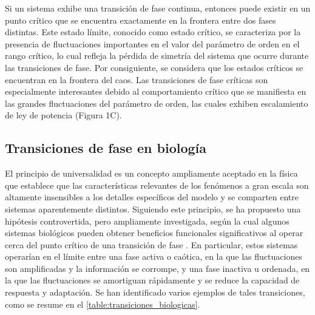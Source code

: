 Si un sistema exhibe una transición de fase continua, entonces puede existir en un punto crítico que se encuentra exactamente en la frontera entre dos fases distintas. Este estado límite, conocido como estado crítico, se caracteriza por la presencia de fluctuaciones importantes en el valor del parámetro de orden en el rango crítico, lo cual refleja la pérdida de simetría del sistema que ocurre durante las transiciones de fase. Por consiguiente, se considera que los estados críticos se encuentran en la frontera del caos. Las transiciones de fase críticas son especialmente interesantes debido al comportamiento crítico que se manifiesta en las grandes fluctuaciones del parámetro de orden, las cuales exhiben escalamiento de ley de potencia (Figura 1C).\\



\subsection{Transiciones de fase en biología}


El principio de universalidad es un concepto ampliamente aceptado en la física que establece que las características relevantes de los fenómenos a gran escala son altamente insensibles a los detalles específicos del modelo y se comparten entre sistemas aparentemente distintos. Siguiendo este principio, se ha propuesto una hipótesis controvertida, pero ampliamente investigada, según la cual algunos sistemas biológicos pueden obtener beneficios funcionales significativos al operar cerca del punto crítico de una transición de fase \cite{munoz_colloquium_2018,hidalgo_information-based_2014,kauffman_origins_1993,bak_how_1996,chialvo_brain_2008,chialvo_emergent_2010,plenz_critical_2013,niebur_criticality_2014,shew_functional_2013,cocchi_criticality_2017,zimmern_why_2020}. En particular, estos sistemas operarían en el límite entre una fase activa o caótica, en la que las fluctuaciones son amplificadas y la información se corrompe, y una fase inactiva u ordenada, en la que las fluctuaciones se amortiguan rápidamente y se reduce la capacidad de respuesta y adaptación. Se han identificado varios ejemplos de tales transiciones, como se resume en el \cref{table:transiciones_biologicas}.\\





